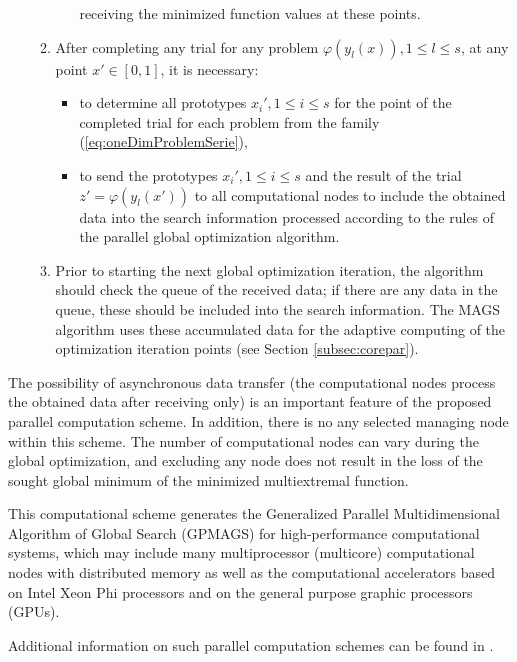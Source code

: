 \documentclass{aims}
\theoremstyle{definition}
\begin{document}
\begin{enumerate}
\begin{enumerate}
\begin{itemize}
      receiving the minimized function values at these points.
    \end{itemize}
    \item After completing any trial for any problem \(\varphi(y_l(x)),1\leq l\leq s\),
    at any point \(x'\in[0,1]\), it is necessary:
    \begin{itemize}
      \item to determine all prototypes \(x_i',1\leq i\leq s\) for the point of the
      completed trial for each problem from the family (\ref{eq:oneDimProblemSerie}),
      \item to send the prototypes \(x_i',1\leq i\leq s\) and the result of the trial
      \(z'=\varphi(y_l(x'))\) to all computational nodes to include the obtained data into
      the search information processed according to the rules of the parallel global optimization algorithm.
    \end{itemize}
    \item Prior to starting the next global optimization iteration, the algorithm
    should check the queue of the received data; if there are any data in the queue,
    these should be included into the search information. The MAGS algorithm uses these
    accumulated data for the adaptive computing of the optimization iteration points (see Section \ref{subsec:corepar}).
\end{enumerate}
\end{enumerate}
\par
The possibility of asynchronous data transfer (the computational nodes process the obtained
data after receiving only) is an important feature of the proposed parallel computation scheme.
In addition, there is no any selected managing node within this scheme. The number of
computational nodes can vary during the global optimization, and excluding any node does not result
in the loss of the sought global minimum of the minimized multiextremal function.
\par
This computational scheme generates the Generalized Parallel Multidimensional Algorithm of
Global Search (GPMAGS) for high-performance computational systems, which may include many
multiprocessor (multicore) computational nodes with distributed memory as well as the
computational accelerators based on Intel Xeon Phi processors and on the general purpose graphic processors (GPUs).
\par
Additional information on such parallel computation schemes can be found in \cite{gergelSidorov2015}.
\end{document}
